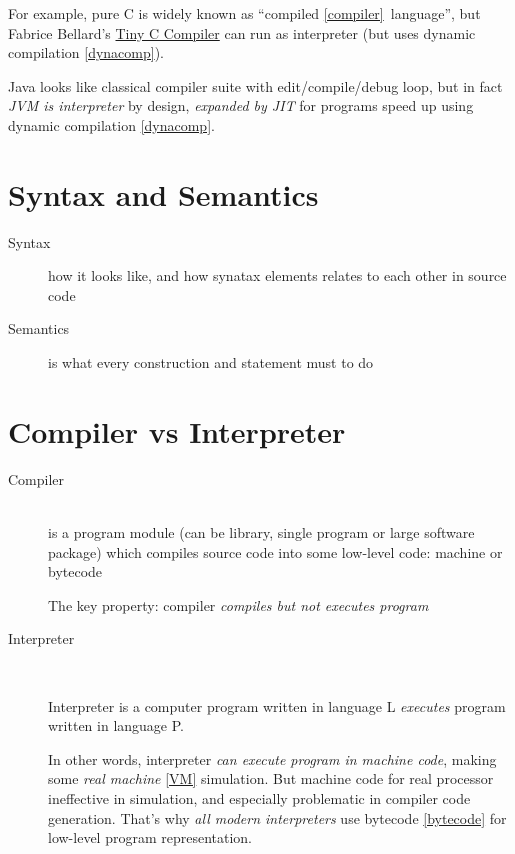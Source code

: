 For example, pure C is widely known as ``compiled \ref{compiler}\ language'',
but Fabrice Bellard's \href{http://bellard.org/tcc/}{Tiny C Compiler} can run
as interpreter (but uses dynamic compilation \ref{dynacomp}).

Java looks like classical compiler suite with edit/compile/debug
loop, but in fact \emph{JVM is interpreter} by design, \emph{expanded by JIT}
for programs speed up using dynamic compilation \ref{dynacomp}.

\section{Syntax and Semantics}

\begin{description}
\item[Syntax]\label{syntax} how it looks like, and how synatax elements relates
to each other in source code
\item[Semantics]\label{semantics} is what every construction and statement must
to do
\end{description}


\section{Compiler vs Interpreter}

\begin{description}
\item[Compiler]\ \\
is a program module (can be library, single program or large
software package) which compiles source code into some low-level code: machine
or bytecode

\setlength{\topsep}{0pt}
\begin{framed}
The key property: compiler \emph{compiles but not executes program}
\end{framed}
\item[Interpreter]\label{interpreter}\ \\
\begin{framed}
Interpreter is a computer program written in language L \emph{executes} program
written in language P.
\end{framed}

In other words, interpreter \emph{can execute program in machine code}, making
some \emph{real machine} \ref{VM} simulation. 
But machine code for real
processor ineffective in simulation, and especially problematic in compiler code generation. That's why
\emph{all modern interpreters} use bytecode \ref{bytecode} for low-level program
representation.
\end{description}

